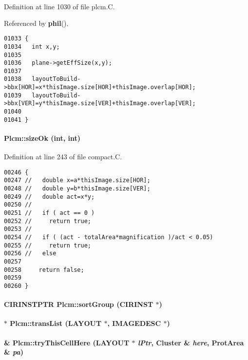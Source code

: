 Definition at line 1030 of file plcm.C.

Referenced by {\bf phil}().\small\begin{verbatim}01033 {
01034   int x,y;
01035   
01036   plane->getEffSize(x,y);
01037   
01038   layoutToBuild->bbx[HOR]=x*thisImage.size[HOR]+thisImage.overlap[HOR]; 
01039   layoutToBuild->bbx[VER]=y*thisImage.size[VER]+thisImage.overlap[VER];
01040   
01041 }
\end{verbatim}\normalsize 
\label{Plcm_c20}
\paragraph{ Plcm::size\-Ok (int, int)\hspace{0.3cm}{\tt  [private]}}\hfill



Definition at line 243 of file compact.C.\small\begin{verbatim}00246 {
00247 //   double x=a*thisImage.size[HOR];
00248 //   double y=b*thisImage.size[VER];
00249 //   double act=x*y;
00250 // 
00251 //   if ( act == 0 )
00252 //     return true;
00253 // 
00254 //   if ( (act - totalArea*magnification )/act < 0.05)
00255 //     return true;
00256 //   else
00257 
00258     return false; 
00259 
00260 }
\end{verbatim}\normalsize 
\label{Plcm_c13}
\paragraph{\setlength{\rightskip}{0pt plus 5cm}CIRINSTPTR Plcm::sort\-Group (CIRINST $\ast$)\hspace{0.3cm}{\tt  [private]}}\hfill

\label{Plcm_c3}
\paragraph{$\ast$ Plcm::trans\-List (LAYOUT $\ast$, {\bf IMAGEDESC} $\ast$)\hspace{0.3cm}{\tt  [private]}}\hfill

\label{Plcm_c11}
\paragraph{ \& Plcm::try\-This\-Cell\-Here (LAYOUT $\ast$ {\em l\-Ptr}, {\bf Cluster} \& {\em here}, {\bf Prot\-Area} \& {\em pa})\hspace{0.3cm}{\tt  [private]}}\hfill



